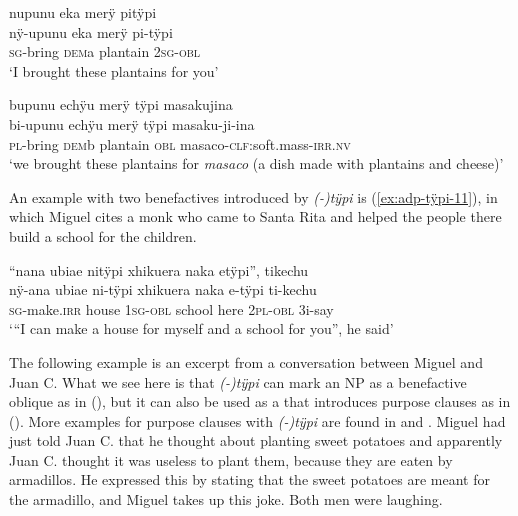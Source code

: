 \ea\label{ex:adp-tÿpi-2}
\begingl
\glpreamble nupunu eka merÿ pitÿpi\\
\gla nÿ-upunu eka merÿ pi-tÿpi\\
\textsc{sg}-bring \textsc{dem}a plantain 2\textsc{sg}-\textsc{obl}\\
\glft ‘I brought these plantains for you’
\endgl
\trailingcitation{[jxx-e191021e-2]}
\xe

\ea\label{ex:adp-tÿpi-3}
\begingl
\glpreamble bupunu echÿu merÿ tÿpi masakujina\\
\gla bi-upunu echÿu merÿ tÿpi masaku-ji-ina\\
\textsc{pl}-bring \textsc{dem}b plantain \textsc{obl} masaco-\textsc{clf:}soft.mass-\textsc{irr.nv}\\
\glft ‘we brought these plantains for \textit{masaco} (a dish made with plantains and cheese)’
\endgl
\trailingcitation{[jxx-e191021e-2]}
\xe

An example with two benefactives introduced by \textit{(-)tÿpi} is (\ref{ex:adp-tÿpi-11}), in which Miguel cites a monk who came to Santa Rita and helped the people there build a school for the children.

\ea\label{ex:adp-tÿpi-11}
\begingl
\glpreamble “nana ubiae nitÿpi xhikuera naka etÿpi”, tikechu\\
\gla nÿ-ana ubiae ni-tÿpi xhikuera naka e-tÿpi ti-kechu\\
\textsc{sg}-make.\textsc{irr} house 1\textsc{sg}-\textsc{obl} school here 2\textsc{pl}-\textsc{obl} 3i-say\\
\glft ‘“I can make a house for myself and a school for you”, he said’
\endgl
\trailingcitation{[mxx-p110825l.110-111]}
\xe

The following example is an excerpt from a conversation between Miguel and Juan C. What we see here is that \textit{(-)tÿpi} can mark an NP as a benefactive oblique as in (), but it can also be used as a  that introduces purpose  clauses as in (). More examples for purpose clauses with \textit{(-)tÿpi} are found in  and .
 Miguel had just told Juan C. that he thought about planting sweet potatoes and apparently Juan C. thought it was useless to plant them, because they are eaten by armadillos. He expressed this by stating that the sweet potatoes are meant for the armadillo, and Miguel takes up this joke. Both men were laughing.


